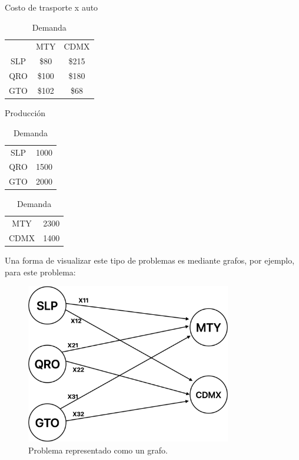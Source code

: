 \documentclass[12pt]{article}  %
\begin{document}
\begin{table}[H]
    \centering
    \begin{minipage}{0.40\textwidth} %
        \centering
        \caption{Costo de trasporte x auto}
        \label{tab:costoProb1}
        \begin{tabular}{ccc}
            & MTY & CDMX \\
            SLP & \$80 & \$215 \\
            QRO & \$100 & \$180 \\
            GTO & \$102 & \$68 \\
        \end{tabular}
    \end{minipage}
    \hfill %
    \begin{minipage}{0.25\textwidth}
        \centering
        \caption{Producción}
        \label{tab:oferProb1}
        \begin{tabular}{cc}
            SLP & 1000 \\
            QRO & 1500 \\
            GTO & 2000 \\
        \end{tabular}
    \end{minipage}
    \hfill
    \begin{minipage}{0.28\textwidth}
        \centering
        \caption{Demanda}
        \label{tab:demProb1}
        \begin{tabular}{cc}
            MTY & 2300 \\
            CDMX & 1400 \\
        \end{tabular}
    \end{minipage}
\end{table}

Una forma de visualizar este tipo de problemas es mediante grafos, por ejemplo, para este problema:

\begin{figure}[H]
\centering
\caption{Problema representado como un grafo.}
\label{fig:grafoProb1}
\includegraphics[width=0.8\textwidth]{assets/Prob1GrafImg.png}
\end{figure}
\end{document}
